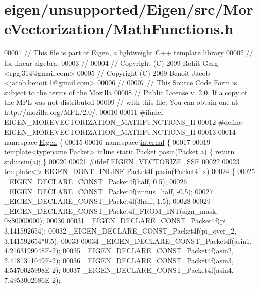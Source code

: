\hypertarget{eigen_2unsupported_2_eigen_2src_2_more_vectorization_2_math_functions_8h_source}{}\section{eigen/unsupported/\+Eigen/src/\+More\+Vectorization/\+Math\+Functions.h}
\label{eigen_2unsupported_2_eigen_2src_2_more_vectorization_2_math_functions_8h_source}

\begin{DoxyCode}
00001 \textcolor{comment}{// This file is part of Eigen, a lightweight C++ template library}
00002 \textcolor{comment}{// for linear algebra.}
00003 \textcolor{comment}{//}
00004 \textcolor{comment}{// Copyright (C) 2009 Rohit Garg <rpg.314@gmail.com>}
00005 \textcolor{comment}{// Copyright (C) 2009 Benoit Jacob <jacob.benoit.1@gmail.com>}
00006 \textcolor{comment}{//}
00007 \textcolor{comment}{// This Source Code Form is subject to the terms of the Mozilla}
00008 \textcolor{comment}{// Public License v. 2.0. If a copy of the MPL was not distributed}
00009 \textcolor{comment}{// with this file, You can obtain one at http://mozilla.org/MPL/2.0/.}
00010 
00011 \textcolor{preprocessor}{#ifndef EIGEN\_MOREVECTORIZATION\_MATHFUNCTIONS\_H}
00012 \textcolor{preprocessor}{#define EIGEN\_MOREVECTORIZATION\_MATHFUNCTIONS\_H}
00013 
00014 \textcolor{keyword}{namespace }\hyperlink{namespace_eigen}{Eigen} \{ 
00015 
00016 \textcolor{keyword}{namespace }\hyperlink{namespaceinternal}{internal} \{
00017 
00019 \textcolor{keyword}{template}<\textcolor{keyword}{typename} Packet> \textcolor{keyword}{inline} \textcolor{keyword}{static} Packet pasin(Packet a) \{ \textcolor{keywordflow}{return} std::asin(a); \}
00020 
00021 \textcolor{preprocessor}{#ifdef EIGEN\_VECTORIZE\_SSE}
00022 
00023 \textcolor{keyword}{template}<> EIGEN\_DONT\_INLINE Packet4f pasin(Packet4f x)
00024 \{
00025   \_EIGEN\_DECLARE\_CONST\_Packet4f(half, 0.5);
00026   \_EIGEN\_DECLARE\_CONST\_Packet4f(minus\_half, -0.5);
00027   \_EIGEN\_DECLARE\_CONST\_Packet4f(3half, 1.5);
00028 
00029   \_EIGEN\_DECLARE\_CONST\_Packet4f\_FROM\_INT(sign\_mask, 0x80000000);
00030 
00031   \_EIGEN\_DECLARE\_CONST\_Packet4f(pi, 3.141592654);
00032   \_EIGEN\_DECLARE\_CONST\_Packet4f(pi\_over\_2, 3.141592654*0.5);
00033 
00034   \_EIGEN\_DECLARE\_CONST\_Packet4f(asin1, 4.2163199048E-2);
00035   \_EIGEN\_DECLARE\_CONST\_Packet4f(asin2, 2.4181311049E-2);
00036   \_EIGEN\_DECLARE\_CONST\_Packet4f(asin3, 4.5470025998E-2);
00037   \_EIGEN\_DECLARE\_CONST\_Packet4f(asin4, 7.4953002686E-2);

\end{DoxyCode}
